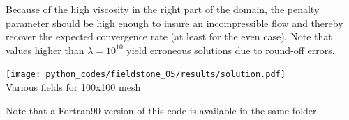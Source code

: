 Because of the high viscosity in the right part of the domain, the penalty parameter should 
be high enough to insure an incompressible flow and thereby recover the expected convergence rate
(at least for the even case). Note that values higher than $\lambda=10^{10}$ yield erroneous solutions 
due to round-off errors. 

\begin{center}
\texttt{[image: python\_codes/fieldstone\_05/results/solution.pdf]}\\
{\captionfont Various fields for 100x100 mesh}
\end{center}


\infortran
Note that a Fortran90 version of this code is available in the same folder. 


